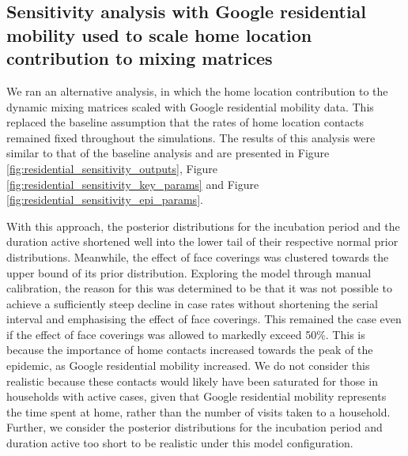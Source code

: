 \subsection{Sensitivity analysis with Google residential mobility used to scale home location contribution to mixing matrices}
We ran an alternative analysis, in which the home location contribution to the dynamic mixing matrices scaled with Google residential mobility data. This replaced the baseline assumption that the rates of home location contacts remained fixed throughout the simulations. The results of this analysis were similar to that of the baseline analysis and are presented in Figure \ref{fig:residential_sensitivity_outputs}, Figure \ref{fig:residential_sensitivity_key_params} and Figure \ref{fig:residential_sensitivity_epi_params}.

With this approach, the posterior distributions for the incubation period and the duration active shortened well into the lower tail of their respective normal prior distributions. Meanwhile, the effect of face coverings was clustered towards the upper bound of its prior distribution. Exploring the model through manual calibration, the reason for this was determined to be that it was not possible to achieve a sufficiently steep decline in case rates without shortening the serial interval and emphasising the effect of face coverings. This remained the case even if the effect of face coverings was allowed to markedly exceed 50\%. This is because the importance of home contacts increased towards the peak of the epidemic, as Google residential mobility increased. We do not consider this realistic because these contacts would likely have been saturated for those in households with active cases, given that Google residential mobility represents the time spent at home, rather than the number of visits taken to a household. Further, we consider the posterior distributions for the incubation period and duration active too short to be realistic under this model configuration.

